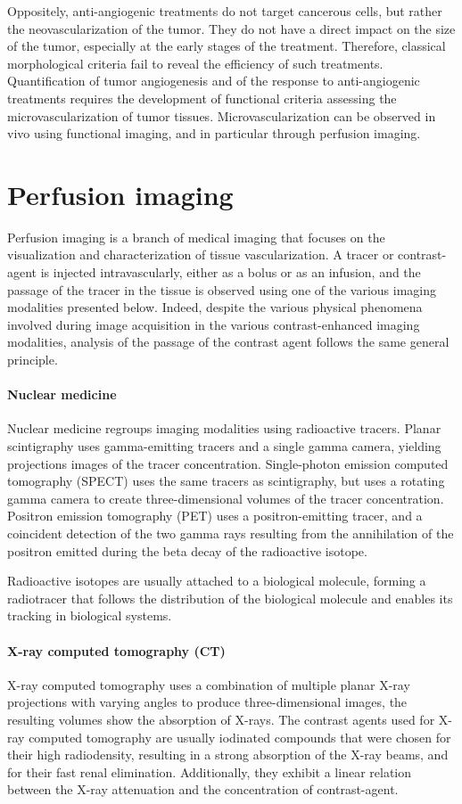 Oppositely, anti-angiogenic treatments do not target cancerous cells, but rather the neovascularization of the tumor.
They do not have a direct impact on the size of the tumor, especially at the early stages of the treatment.
Therefore, classical morphological criteria fail to reveal the efficiency of such treatments.
Quantification of tumor angiogenesis and of the response to anti-angiogenic treatments requires the development of functional criteria assessing the microvascularization of tumor tissues.
Microvascularization can be observed in vivo using functional imaging, and in particular through perfusion imaging.

\section{Perfusion imaging}
\label{sec:IntroPerfusionImaging}
Perfusion imaging is a branch of medical imaging that focuses on the visualization and characterization of tissue vascularization.
A tracer or contrast-agent is injected intravascularly, either as a bolus or as an infusion, and the passage of the tracer in the tissue is observed using one of the various imaging modalities presented below.
Indeed, despite the various physical phenomena involved during image acquisition in the various contrast-enhanced imaging modalities, analysis of the passage of the contrast agent follows the same general principle.

\paragraph{Nuclear medicine}
\label{sec:IntroNM}
Nuclear medicine regroups imaging modalities using radioactive tracers. 
Planar scintigraphy uses gamma-emitting tracers and a single gamma camera, yielding projections images of the tracer concentration.
Single-photon emission computed tomography (SPECT) uses the same tracers as scintigraphy, but uses a rotating gamma camera to create three-dimensional volumes of the tracer concentration.
Positron emission tomography (PET) uses a positron-emitting tracer, and a coincident detection of the two gamma rays resulting from the annihilation of the positron emitted during the beta decay of the radioactive isotope.

Radioactive isotopes are usually attached to a biological molecule, forming a radiotracer that follows the distribution of the biological molecule and enables its tracking in biological systems.

\paragraph{X-ray computed tomography (CT)}
\label{sec:IntroCT}
X-ray computed tomography uses a combination of multiple planar X-ray projections with varying angles to produce three-dimensional images, the resulting volumes show the absorption of X-rays. 
The contrast agents used for X-ray computed tomography are usually iodinated compounds that were chosen for their high radiodensity, resulting in a strong absorption of the X-ray beams, and for their fast renal elimination.
Additionally, they exhibit a linear relation between the X-ray attenuation and the concentration of contrast-agent.

